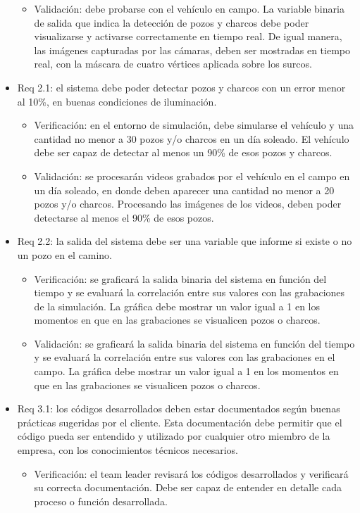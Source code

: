\documentclass[
11pt, %
]{charter}
\begin{document}
\begin{itemize}
\begin{itemize}
		\item Validación: debe probarse con el vehículo en campo. La variable binaria de salida que indica la detección de pozos y charcos debe poder visualizarse y activarse correctamente en tiempo real. De igual manera, las imágenes capturadas por las cámaras, deben ser mostradas en tiempo real, con la máscara de cuatro vértices aplicada sobre los surcos.
	\end{itemize}
	\item Req 2.1: el sistema debe poder detectar pozos y charcos con un error menor al 10\%, en buenas condiciones de iluminación.
	\begin{itemize}
		\item Verificación: en el entorno de simulación, debe simularse el vehículo y una cantidad no menor a 30 pozos y/o charcos en un día soleado. El vehículo debe ser capaz de detectar al menos un 90\% de esos pozos y charcos.
		\item Validación: se procesarán videos grabados por el vehículo en el campo en un día soleado, en donde deben aparecer una cantidad no menor a 20 pozos y/o charcos. Procesando las imágenes de los videos, deben poder detectarse al menos el 90\% de esos pozos.
	\end{itemize}
	\item Req 2.2: la salida del sistema debe ser una variable que informe si existe o no un pozo en el camino.
	\begin{itemize}
		\item Verificación: se graficará la salida binaria del sistema en función del tiempo y se evaluará la correlación entre sus valores con las grabaciones de la simulación. La gráfica debe mostrar un valor igual a 1 en los momentos en que en las grabaciones se visualicen pozos o charcos.
		\item Validación: se graficará la salida binaria del sistema en función del tiempo y se evaluará la correlación entre sus valores con las grabaciones en el campo. La gráfica debe mostrar un valor igual a 1 en los momentos en que en las grabaciones se visualicen pozos o charcos.
	\end{itemize}
	\item Req 3.1: los códigos desarrollados deben estar documentados según buenas prácticas sugeridas por el cliente. Esta documentación debe permitir que el código pueda ser entendido y utilizado por cualquier otro miembro de la empresa, con los conocimientos técnicos necesarios.
	\begin{itemize}
		\item Verificación: el team leader revisará los códigos desarrollados y verificará su correcta documentación. Debe ser capaz de entender en detalle cada proceso o función desarrollada.

\end{itemize}
\end{itemize}
\end{document}
